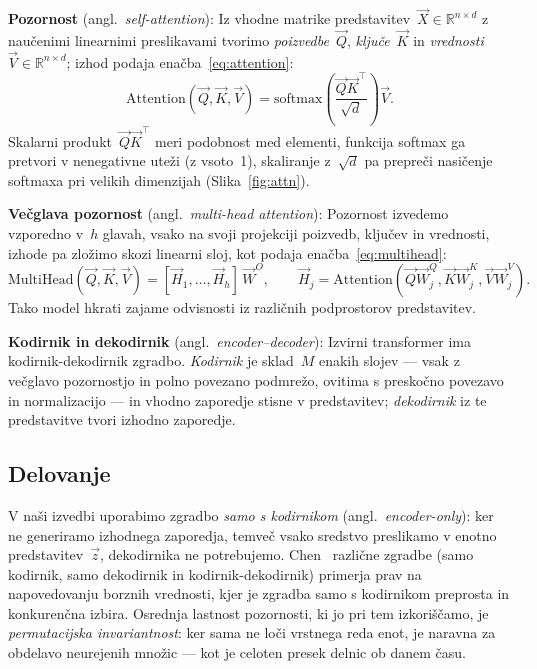 \noindent\textbf{Pozornost} (angl.\ \emph{self-attention}): Iz vhodne matrike predstavitev~$\vec{X}\in\mathbb{R}^{n\times d}$ z naučenimi linearnimi preslikavami tvorimo \emph{poizvedbe}~$\vec{Q}$, \emph{ključe}~$\vec{K}$ in \emph{vrednosti}~$\vec{V}\in\mathbb{R}^{n\times d}$; izhod podaja enačba~\eqref{eq:attention}:
\begin{equation}
\label{eq:attention}
  \mathrm{Attention}(\vec{Q},\vec{K},\vec{V}) = \mathrm{softmax}\!\left(\frac{\vec{Q}\vec{K}^{\!\top}}{\sqrt{d}}\right)\vec{V}.
\end{equation}
Skalarni produkt~$\vec{Q}\vec{K}^{\!\top}$ meri podobnost med elementi, funkcija softmax ga pretvori v nenegativne uteži (z vsoto~1), skaliranje z~$\sqrt{d}$ pa prepreči nasičenje softmaxa pri velikih dimenzijah (Slika~\ref{fig:attn}).

\noindent\textbf{Večglava pozornost} (angl.\ \emph{multi-head attention}): Pozornost izvedemo vzporedno v~$h$ glavah, vsako na svoji projekciji poizvedb, ključev in vrednosti, izhode pa zložimo skozi linearni sloj, kot podaja enačba~\eqref{eq:multihead}:
\begin{equation}
\label{eq:multihead}
  \mathrm{MultiHead}(\vec{Q},\vec{K},\vec{V}) = [\vec{H}_1,\dots,\vec{H}_h]\,\vec{W}^{O},\qquad
  \vec{H}_j=\mathrm{Attention}(\vec{Q}\vec{W}_j^{Q},\vec{K}\vec{W}_j^{K},\vec{V}\vec{W}_j^{V}).
\end{equation}
Tako model hkrati zajame odvisnosti iz različnih podprostorov predstavitev.

\noindent\textbf{Kodirnik in dekodirnik} (angl.\ \emph{encoder--decoder}): Izvirni transformer ima kodirnik-dekodirnik zgradbo. \emph{Kodirnik} je sklad~$M$ enakih slojev --- vsak z večglavo pozornostjo in polno povezano podmrežo, ovitima s preskočno povezavo in normalizacijo --- in vhodno zaporedje stisne v predstavitev; \emph{dekodirnik} iz te predstavitve tvori izhodno zaporedje.

\subsection{Delovanje}

V naši izvedbi uporabimo zgradbo \emph{samo s kodirnikom} (angl.\ \emph{encoder-only}): ker ne generiramo izhodnega zaporedja, temveč vsako sredstvo preslikamo v enotno predstavitev~$\vec{z}$, dekodirnika ne potrebujemo. Chen~\cite{chen2025} različne zgradbe (samo kodirnik, samo dekodirnik in kodirnik-dekodirnik) primerja prav na napovedovanju borznih vrednosti, kjer je zgradba samo s kodirnikom preprosta in konkurenčna izbira. Osrednja lastnost pozornosti, ki jo pri tem izkoriščamo, je \emph{permutacijska invariantnost}: ker sama ne loči vrstnega reda enot, je naravna za obdelavo neurejenih množic --- kot je celoten presek delnic ob danem času.

